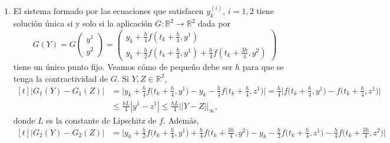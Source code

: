\documentclass[11pt]{report}
\newcommand{\R}{\mathbb R}
\begin{document}
\begin{enumerate}
\[\begin{array}{cc}
    1/4 & 0 \\
    0 & 3/4
  \end{array}\right)\left(\begin{array}{cc}
    1/4 & 0 \\
    0 & 3/4
  \end{array}\right)\left(\begin{array}{c}
    1 \\
    1
  \end{array}\right) = \left(\begin{array}{cc}
    1/8 & 3/8
  \end{array}\right)\left(\begin{array}{c}
    1/4 \\
    3/4
  \end{array}\right) = \frac{1}{32}+\frac{9}{32} = \frac{5}{16} \neq \frac{1}{3}\]
  Por tanto, el método es de orden $2$ si y solo si $\gamma = \frac{1}{4}$, y en ese caso no es de orden $3$.
  \item El sistema formado por las ecuaciones que satisfacen $y_k^{(i)}$, $i=1,2$ tiene solución única si y solo si la aplicación $G \colon \R^2 \to \R^2$ dada por 
  \[G(Y)=G\left(\begin{array}{c}
    y^1 \\
    y^2
  \end{array}\right)=\left(\begin{array}{c}
    y_k+\frac{h}{4}f(t_k+\frac{h}{4},y^1) \\[5pt]
    y_k+\frac{h}{2}f(t_k+\frac{h}{4},y^1)+\frac{h}{4}f(t_k+\frac{3h}{4},y^2)
  \end{array}\right)\]
  tiene un único punto fijo. Veamos cómo de pequeño debe ser $h$ para que se tenga la contractividad de $G$. Si $Y,Z \in \R^2$,
  \[
  \begin{aligned}[t]
     |G_1(Y)-G_1(Z)| &= \bigl|y_k+\frac{h}{4}f\bigl(t_k+\frac{h}{4},y^1\bigr) -y_k-\frac{h}{4}f\bigl(t_k+\frac{h}{4},z^1\bigr) \bigr| = \frac{h}{4}\bigl|f\bigl(t_k+\frac{h}{4},y^1\bigr)-f\bigl(t_k+\frac{h}{4},z^1\bigr)\bigr| \\
     &\leq \frac{hL}{4} |y^1-z^1| \leq \frac{hL}{4} ||Y-Z||_{\infty},
  \end{aligned}
  \]
  donde $L$ es la constante de Lipschitz de $f$. Además,
  \[
  \begin{aligned}[t]
     |G_2(Y)-G_2(Z)| &= \bigl|y_k+\frac{h}{2}f\bigl(t_k+\frac{h}{4},y^1\bigr)+\frac{h}{4}f\bigl(t_k+\frac{3h}{4},y^2\bigr)-y_k-\frac{h}{2}f\bigl(t_k+\frac{h}{4},z^1\bigr)-\frac{h}{4}f\bigl(t_k+\frac{3h}{4},z^2\bigr) \bigr|  \\

\end{aligned}\]
\end{enumerate}
\end{document}
